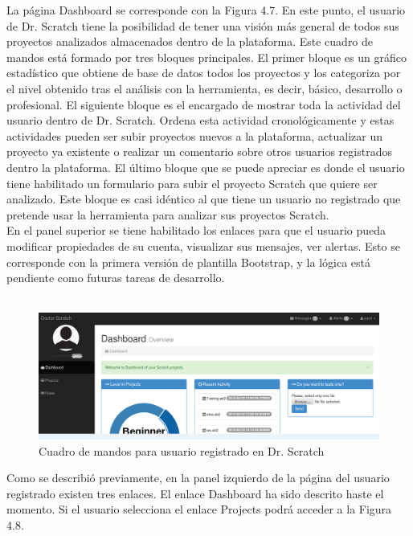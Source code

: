 \documentclass[a4paper, 12pt]{book}
\begin{document}
La página Dashboard se corresponde con la Figura 4.7. En este punto, el usuario de 
Dr. Scratch tiene la posibilidad de tener una visión más general de todos sus proyectos
analizados almacenados dentro de la plataforma. Este cuadro de mandos está formado por
tres bloques principales. El primer bloque es un gráfico estadístico que obtiene de 
base de datos todos los proyectos y los categoriza por el nivel obtenido tras el 
análisis con la herramienta, es decir, básico, desarrollo o profesional. El siguiente
bloque es el encargado de mostrar toda la actividad del usuario dentro de Dr. Scratch.
Ordena esta actividad cronológicamente y estas actividades pueden ser subir proyectos 
nuevos a la plataforma, actualizar un proyecto ya existente o realizar un comentario sobre
otros usuarios registrados dentro la plataforma. El último bloque que se puede apreciar es
donde el usuario tiene habilitado un formulario para subir el proyecto Scratch que quiere
ser analizado. Este bloque es casi idéntico al que tiene un usuario no registrado que 
pretende usar la herramienta para analizar sus proyectos Scratch. \\ 

En el panel superior se tiene habilitado los enlaces para que el usuario pueda modificar
propiedades de su cuenta, visualizar sus mensajes, ver alertas. Esto se corresponde con
la primera versión de plantilla Bootstrap, y la lógica está pendiente como futuras tareas
de desarrollo. \\ \\

\begin{figure}
	\graphicspath{{img/}}
  \includegraphics[bb=0 0 800 600, width=12cm, keepaspectratio]{dashboardprincipal.png}
	\caption{Cuadro de mandos para usuario registrado en Dr. Scratch}
  \label{figura:foro_hilos}
\end{figure}

Como se describió previamente, en la panel izquierdo de la página del usuario registrado 
existen tres enlaces. El enlace Dashboard ha sido descrito haste el momento. Si el usuario
selecciona el enlace Projects podrá acceder a la Figura 4.8.  \\
\end{document}
